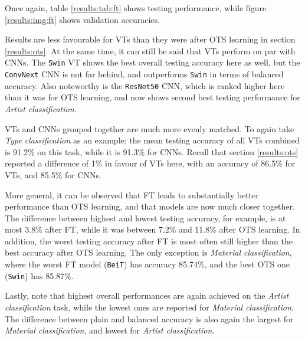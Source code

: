 Once again, table \ref{results:tab:ft} shows testing performance, while figure \ref{results:img:ft} shows validation accuracies.

Results are less favourable for VTs than they were after OTS learning in section \ref{results:ots}. At the same time, it can still be said that VTs perform on par with CNNs. The \texttt{Swin} VT shows the best overall testing accuracy here as well, but the \texttt{ConvNext} CNN is not far behind, and outperforms \texttt{Swin} in terms of balanced accuracy. Also noteworthy is the \texttt{ResNet50} CNN, which is ranked higher here than it was for OTS learning, and now shows second best testing performance for \textit{Artist classification}.

VTs and CNNs grouped together are much more evenly matched. To again take \textit{Type classification} as an example: the mean testing accuracy of all VTs combined is 91.2\% on this task, while it is 91.3\% for CNNs. Recall that section \ref{results:ots} reported a difference of 1\% in favour of VTs here, with an accuracy of 86.5\% for VTs, and 85.5\% for CNNs.

More general, it can be observed that FT leads to substantially better performance than OTS learning, and that models are now much closer together. The difference between highest and lowest testing accuracy, for example, is at most 3.8\% after FT, while it was between 7.2\% and 11.8\% after OTS learning. In addition, the worst testing accuracy after FT is most often still higher than the best accuracy after OTS learning. The only exception is \textit{Material classification}, where the worst FT model (\texttt{BeiT}) has accuracy 85.74\%, and the best OTS one (\texttt{Swin}) has 85.87\%.

Lastly, note that highest overall performances are again achieved on the \textit{Artist classification} task, while the lowest ones are reported for \textit{Material classification}. The difference between plain and balanced accuracy is also again the largest for \textit{Material classification}, and lowest for \textit{Artist classification}.



